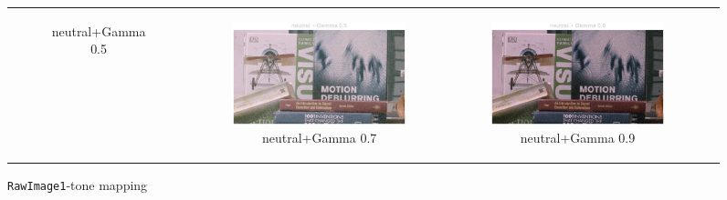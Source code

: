 \documentclass[11pt, a4]{article}
\begin{document}
\begin{enumerate}
\begin{figure}[h]
{\begin{tabular}{cccc}
\begin{subfigure}[h]{0.45\linewidth}
							\caption{neutral+Gamma 0.5}
							\label{fig:RawImage1_tone_10}
						\end{subfigure} &
						\begin{subfigure}[h]{0.45\linewidth}
							\centering
							\includegraphics[width=\linewidth]{../output/RawImage1_Tone_neutral_Gamma0.5.pdf}
							\caption{neutral+Gamma 0.7}
							\label{fig:RawImage1_tone_11}
						\end{subfigure} &
						\begin{subfigure}[h]{0.45\linewidth}
							\centering
							\includegraphics[width=\linewidth]{../output/RawImage1_Tone_neutral_Gamma0.9.pdf}
							\caption{neutral+Gamma 0.9}
							\label{fig:RawImage1_tone_12}
						\end{subfigure}
					\end{tabular}
				}
				\caption{\texttt{RawImage1}-tone mapping}
				\label{fig:RawImage1_tone}
			\end{figure}
			\begin{figure}[H]
				\centering
				\resizebox{\linewidth}{!}{
}
\end{figure}
\end{enumerate}
\end{document}
